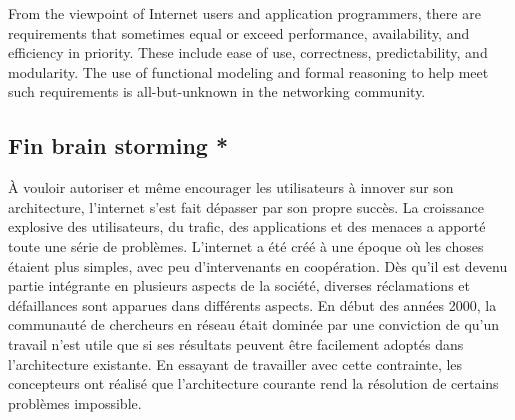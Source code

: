 From the viewpoint of Internet users and application programmers, there are requirements that sometimes equal or exceed performance, availability, and efficiency in priority. These include ease of use, correctness, predictability, and modularity. The use of functional modeling and formal reasoning to help meet such requirements is all-but-unknown in the networking community.


\subsection*{Fin brain storming *}





À vouloir autoriser et même encourager les utilisateurs à innover sur son architecture, l'internet s'est fait dépasser par son propre succès. La croissance explosive des utilisateurs, du trafic, des applications et des menaces a apporté toute une série de problèmes. L'internet a été créé à une époque où les choses étaient plus simples, avec peu d'intervenants en coopération. Dès qu'il est devenu partie intégrante en plusieurs aspects de la société, diverses réclamations et défaillances sont apparues dans différents aspects. En début des années 2000, la communauté de chercheurs en réseau était dominée par une conviction de qu'un travail n'est utile que si ses résultats peuvent être facilement adoptés dans l'architecture existante. En essayant de travailler avec cette contrainte, les concepteurs ont réalisé que l'architecture courante rend la résolution de certains problèmes impossible. \cite{InternetEvolutionRoleSoftwareEngineering}






